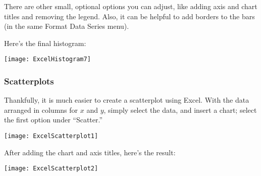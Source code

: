 There are other small, optional options you can adjust, like adding axis and chart titles and removing the legend.  Also, it can be helpful to add borders to the bars (in the same Format Data Series menu).

Here's the final histogram:
\begin{center}
\texttt{[image: ExcelHistogram7]}
\end{center}
\pagebreak

\subsubsection{Scatterplots}
Thankfully, it is much easier to create a scatterplot using Excel.  With the data arranged in columns for $x$ and $y$, simply select the data, and insert a chart; select the first option under ``Scatter.''
\begin{center}
\texttt{[image: ExcelScatterplot1]}
\end{center}

After adding the chart and axis titles, here's the result:
\begin{center}
\texttt{[image: ExcelScatterplot2]}
\end{center}